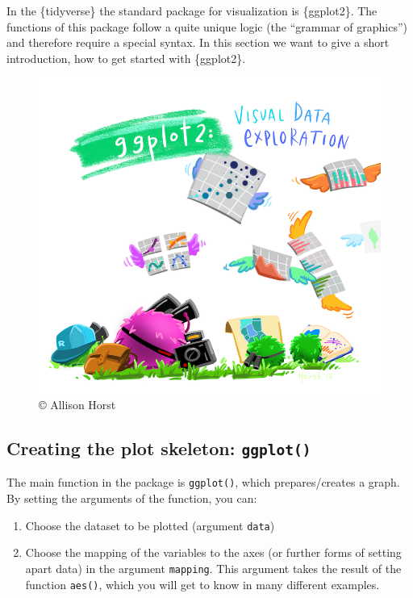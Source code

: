 \documentclass[]{book}
\providecommand{\tightlist}{%
  \setlength{\itemsep}{0pt}\setlength{\parskip}{0pt}}
\begin{document}
In the \{tidyverse\} the standard package for visualization is \{ggplot2\}.
The functions of this package follow a quite unique logic (the ``grammar of graphics'') and therefore require a special syntax.
In this section we want to give a short introduction, how to get started with \{ggplot2\}.

\begin{figure}

\hfill{}\includegraphics[width=11.11in]{img/ggplot2_exploratory} 

\caption{© Allison Horst}\label{fig:unnamed-chunk-29}
\end{figure}

\hypertarget{creating-the-plot-skeleton-ggplot}{%
\subsection{\texorpdfstring{Creating the plot skeleton: \texttt{ggplot()}}{Creating the plot skeleton: ggplot()}}\label{creating-the-plot-skeleton-ggplot}}

The main function in the package is \texttt{ggplot()}, which prepares/creates a graph.
By setting the arguments of the function, you can:

\begin{enumerate}
\def\labelenumi{\arabic{enumi}.}
\tightlist
\item
  Choose the dataset to be plotted (argument \texttt{data})
\item
  Choose the mapping of the variables to the axes (or further forms of setting apart data) in the argument \texttt{mapping}.
  This argument takes the result of the function \texttt{aes()}, which you will get to know in many different examples.
\end{enumerate}
\end{document}
